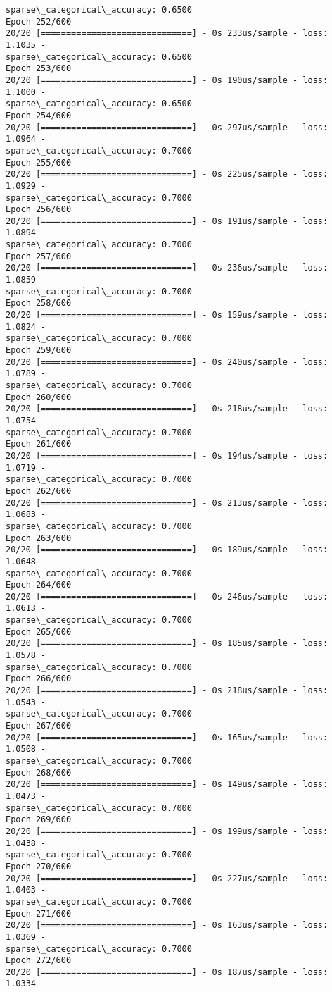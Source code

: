 \documentclass[11pt]{article}
\begin{document}
\begin{Verbatim}[commandchars=\\\{\}]
sparse\_categorical\_accuracy: 0.6500
Epoch 252/600
20/20 [==============================] - 0s 233us/sample - loss: 1.1035 -
sparse\_categorical\_accuracy: 0.6500
Epoch 253/600
20/20 [==============================] - 0s 190us/sample - loss: 1.1000 -
sparse\_categorical\_accuracy: 0.6500
Epoch 254/600
20/20 [==============================] - 0s 297us/sample - loss: 1.0964 -
sparse\_categorical\_accuracy: 0.7000
Epoch 255/600
20/20 [==============================] - 0s 225us/sample - loss: 1.0929 -
sparse\_categorical\_accuracy: 0.7000
Epoch 256/600
20/20 [==============================] - 0s 191us/sample - loss: 1.0894 -
sparse\_categorical\_accuracy: 0.7000
Epoch 257/600
20/20 [==============================] - 0s 236us/sample - loss: 1.0859 -
sparse\_categorical\_accuracy: 0.7000
Epoch 258/600
20/20 [==============================] - 0s 159us/sample - loss: 1.0824 -
sparse\_categorical\_accuracy: 0.7000
Epoch 259/600
20/20 [==============================] - 0s 240us/sample - loss: 1.0789 -
sparse\_categorical\_accuracy: 0.7000
Epoch 260/600
20/20 [==============================] - 0s 218us/sample - loss: 1.0754 -
sparse\_categorical\_accuracy: 0.7000
Epoch 261/600
20/20 [==============================] - 0s 194us/sample - loss: 1.0719 -
sparse\_categorical\_accuracy: 0.7000
Epoch 262/600
20/20 [==============================] - 0s 213us/sample - loss: 1.0683 -
sparse\_categorical\_accuracy: 0.7000
Epoch 263/600
20/20 [==============================] - 0s 189us/sample - loss: 1.0648 -
sparse\_categorical\_accuracy: 0.7000
Epoch 264/600
20/20 [==============================] - 0s 246us/sample - loss: 1.0613 -
sparse\_categorical\_accuracy: 0.7000
Epoch 265/600
20/20 [==============================] - 0s 185us/sample - loss: 1.0578 -
sparse\_categorical\_accuracy: 0.7000
Epoch 266/600
20/20 [==============================] - 0s 218us/sample - loss: 1.0543 -
sparse\_categorical\_accuracy: 0.7000
Epoch 267/600
20/20 [==============================] - 0s 165us/sample - loss: 1.0508 -
sparse\_categorical\_accuracy: 0.7000
Epoch 268/600
20/20 [==============================] - 0s 149us/sample - loss: 1.0473 -
sparse\_categorical\_accuracy: 0.7000
Epoch 269/600
20/20 [==============================] - 0s 199us/sample - loss: 1.0438 -
sparse\_categorical\_accuracy: 0.7000
Epoch 270/600
20/20 [==============================] - 0s 227us/sample - loss: 1.0403 -
sparse\_categorical\_accuracy: 0.7000
Epoch 271/600
20/20 [==============================] - 0s 163us/sample - loss: 1.0369 -
sparse\_categorical\_accuracy: 0.7000
Epoch 272/600
20/20 [==============================] - 0s 187us/sample - loss: 1.0334 -

\end{Verbatim}
\end{document}
